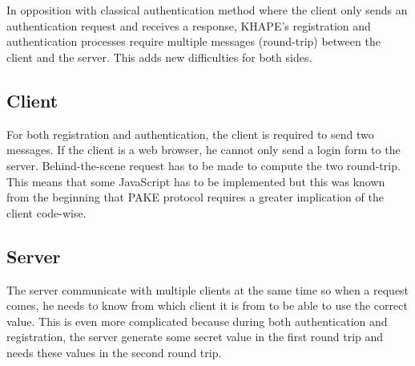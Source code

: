 ﻿\documentclass[../report.tex]{subfiles}
\begin{document}
% 
% 
% 
% 
% 
% 
% 
% 


\section{}
In opposition with classical authentication method where the client only sends an authentication request and receives a response, KHAPE's registration and authentication processes require multiple messages (round-trip) between the client and the server.
This adds new difficulties for both sides.

\subsection{Client}
For both registration and authentication, the client is required to send two messages. If the client is a web browser, he cannot only send a login form to the server. Behind-the-scene request has to be made to compute the two round-trip. This means that some JavaScript has to be implemented but this was known from the beginning that PAKE protocol requires a greater implication of the client code-wise.


\subsection{Server}
The server communicate with multiple clients at the same time so when a request comes, he needs to know from which client it is from to be able to use the correct value. This is even more complicated because during both authentication and registration, the server generate some secret value in the first round trip and needs these values in the second round trip.
\end{document}
